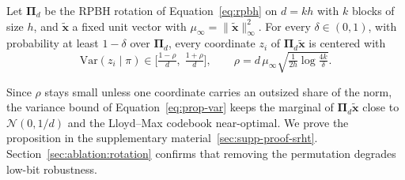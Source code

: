 \begin{proposition}
\label{prop:marginal}
Let $\boldsymbol{\Pi}_d$ be the RPBH rotation of Equation~\eqref{eq:rpbh} on $d = kh$ with $k$ blocks of size $h$, and $\tilde{\mathbf{x}}$ a fixed unit vector with $\mu_\infty = \|\tilde{\mathbf{x}}\|_\infty^2$. For every $\delta \in (0, 1)$, with probability at least $1 - \delta$ over $\boldsymbol{\Pi}_d$, every coordinate $z_i$ of $\boldsymbol{\Pi}_d \tilde{\mathbf{x}}$ is centered with
\begin{equation}
\mathrm{Var}(z_i \mid \pi) \in \Big[\tfrac{1-\rho}{d},\; \tfrac{1+\rho}{d}\Big], \qquad \rho = d\,\mu_\infty \sqrt{\tfrac{1}{2h}\log\tfrac{4k}{\delta}}.
\label{eq:prop-var}
\end{equation}
\end{proposition}

Since $\rho$ stays small unless one coordinate carries an outsized share of the norm, the variance bound of Equation~\eqref{eq:prop-var} keeps the marginal of $\boldsymbol{\Pi}_d \tilde{\mathbf{x}}$ close to $\mathcal{N}(0, 1/d)$ and the Lloyd--Max codebook near-optimal. We prove the proposition in the supplementary material~\ref{sec:supp-proof-srht}. Section~\ref{sec:ablation:rotation} confirms that removing the permutation degrades low-bit robustness.





